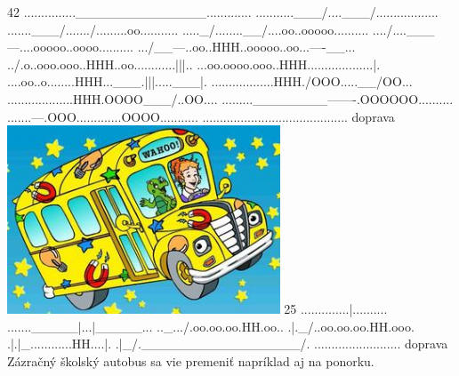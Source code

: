  42
...............______________.............
...........___/....___/......\bs{}............
.......___/......./.........oo\bs{}...........
....._/........__/....oo..ooooo\bs{}..........
..../....___---...\bs{}.ooooo..oooo.\bs{}.........
.../__---..oo..HHH.\bs{}.ooooo..oo...----__...
../.o..ooo.ooo..HHH.\bs{}.oo............|||\bs{}..
..\bs{}.oo.oooo.ooo..HHH.\bs{}..................|.
...\bs{}.oo..o........HHH.\bs{}..___.|||.....___|.
....\bs{}..............HHH.\bs{}/OOO\bs{}.....__/OO...
.....\bs{}..............HHH.\bs{}OOOO\bs{}___/..OO....
......\bs{}...________-------.OOOOOO..........
.......---.OOO.............OOOO...........
..........................................
\vystup
doprava
\komentar
\includegraphics[width=230pt]{prikl1-autobus.jpg}
\koniec
 25
..............|..........
......._____|...|_____...
.._.../.oo.oo.oo.HH.oo\bs{}..
.|.\bs{}_/..oo.oo.oo.HH.ooo\bs{}.
.|.|_............HH....|.
.|_/.\bs{}_________________/.
.........................
\vystup
doprava
\komentar
Zázračný školský autobus sa vie premeniť napríklad aj na ponorku.
\koniec


